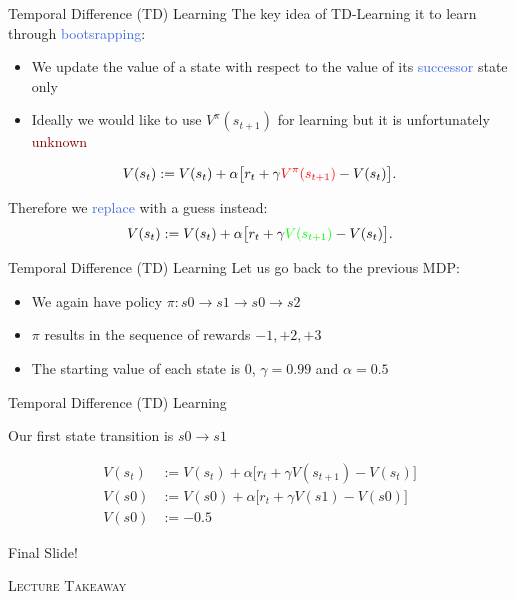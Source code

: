 \documentclass{beamer}
\newenvironment{takeaway}[1]{%
	\definecolor{shadecolor}{gray}{0.9}%
		\begin{shaded}{\color{skymagenta}\noindent\textsc{#1}}\\%
		}{%
		\end{shaded}%
}
\begin{document}
\begin{frame}{Temporal Difference (TD) Learning}
	The key idea of TD-Learning it to learn through \textcolor{RoyalBlue}{bootsrapping}:
	\begin{itemize}
		\item We update the value of a state with respect to the value of its \textcolor{RoyalBlue}{successor} state only
		\item Ideally we would like to use $V^{\pi}(s_{t+1})$ for learning but it is unfortunately \textcolor{Maroon}{unknown}
	\end{itemize}
	
	\begin{align*}
		V(s_t):= V(s_t) + \alpha \big[r_t + \gamma \textcolor{red}{V^{\pi}(s_{t+1})} - V(s_t)\big].
	\end{align*}


	Therefore we \textcolor{RoyalBlue}{replace} with a guess instead:
	\begin{align*}
		V(s_t):= V(s_t) + \alpha \big[r_t + \gamma \textcolor{green}{V(s_{t+1})} - V(s_t)\big].
	\end{align*}
	
\end{frame}

\begin{frame}{Temporal Difference (TD) Learning}
	Let us go back to the previous MDP:
	\begin{center}
	
	\end{center}

	\begin{itemize}
		\item We again have policy $\pi: s0\rightarrow s1 \rightarrow s0 \rightarrow s2$
		\item $\pi$ results in the sequence of rewards $-1, +2, +3$
		\item The starting value of each state is $0$, $\gamma=0.99$ and $\alpha=0.5$
	\end{itemize}
	
\end{frame}


\begin{frame}{Temporal Difference (TD) Learning}
	\begin{center}
	
	\end{center}

	Our first state transition is $s0 \rightarrow s1$

	\begin{align*}
		V(s_t) & := V(s_t) + \alpha \big[r_t + \gamma V(s_{t+1}) - V(s_t)\big] \\
		V(s0) & := V(s0) + \alpha \big[r_t + \gamma V(s1) - V(s0)\big] \\ 
		V(s0) & := -0.5
	\end{align*}

\end{frame}



\begin{frame}{Final Slide!}
	\begin{takeaway}{Lecture Takeaway}
	\end{takeaway}
\end{frame}

\end{document}
